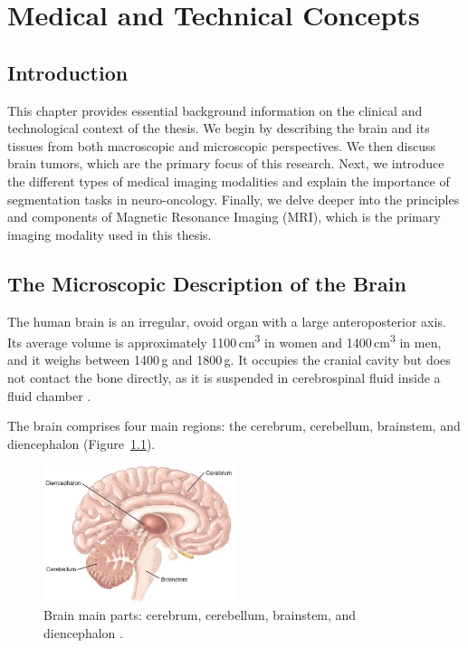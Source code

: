 \chapter{Medical and Technical Concepts}

\section{Introduction}
This chapter provides essential background information on the clinical and technological context of the thesis. We begin by describing the brain and its tissues from both macroscopic and microscopic perspectives. We then discuss brain tumors, which are the primary focus of this research. Next, we introduce the different types of medical imaging modalities and explain the importance of segmentation tasks in neuro-oncology. Finally, we delve deeper into the principles and components of Magnetic Resonance Imaging (MRI), which is the primary imaging modality used in this thesis.

\section{The Microscopic Description of the Brain}

The human brain is an irregular, ovoid organ with a large anteroposterior axis. Its average volume is approximately 1100\,cm\textsuperscript{3} in women and 1400\,cm\textsuperscript{3} in men, and it weighs between 1400\,g and 1800\,g. It occupies the cranial cavity but does not contact the bone directly, as it is suspended in cerebrospinal fluid inside a fluid chamber \cite{ref3}.

The brain comprises four main regions: the cerebrum, cerebellum, brainstem, and diencephalon (Figure~\ref{fig:brain-regions}).

\begin{figure}[ht]
  \centering
  \includegraphics[width=0.5\textwidth]{Images/Chapter0/brain.jpg}
  \caption{Brain main parts: cerebrum, cerebellum, brainstem, and diencephalon \cite{freudenrich2013visualizing}.}
  \label{fig:brain-regions}
\end{figure}

